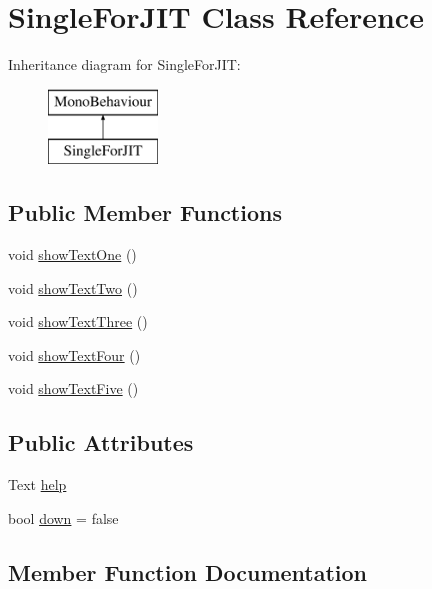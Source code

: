 \hypertarget{class_single_for_j_i_t}{}\section{Single\+For\+J\+IT Class Reference}
\label{class_single_for_j_i_t}
Inheritance diagram for Single\+For\+J\+IT\+:\begin{figure}[H]
\begin{center}
\leavevmode
\includegraphics[height=2.000000cm]{class_single_for_j_i_t}
\end{center}
\end{figure}
\subsection*{Public Member Functions}
\begin{DoxyCompactItemize}
\item 
void \hyperlink{class_single_for_j_i_t_a637be64400ccf0fac91a7503216e0916}{show\+Text\+One} ()
\item 
void \hyperlink{class_single_for_j_i_t_adab7f17e960e7922bd9c6d52c20d9ddc}{show\+Text\+Two} ()
\item 
void \hyperlink{class_single_for_j_i_t_a6ecbdf5db4992f360a96c4be8baae618}{show\+Text\+Three} ()
\item 
void \hyperlink{class_single_for_j_i_t_a8236062b1d9263e5421c058feb24cb64}{show\+Text\+Four} ()
\item 
void \hyperlink{class_single_for_j_i_t_aef6925dd0767f37d9891c8426829e22d}{show\+Text\+Five} ()
\end{DoxyCompactItemize}
\subsection*{Public Attributes}
\begin{DoxyCompactItemize}
\item 
Text \hyperlink{class_single_for_j_i_t_a15ec1c2f3995f7ae8c7d22a3ad4a312e}{help}
\item 
bool \hyperlink{class_single_for_j_i_t_aee228f087ebd95f4b92b6353c0297796}{down} = false
\end{DoxyCompactItemize}


\subsection{Member Function Documentation}
\mbox{\label{class_single_for_j_i_t_aef6925dd0767f37d9891c8426829e22d}} 
